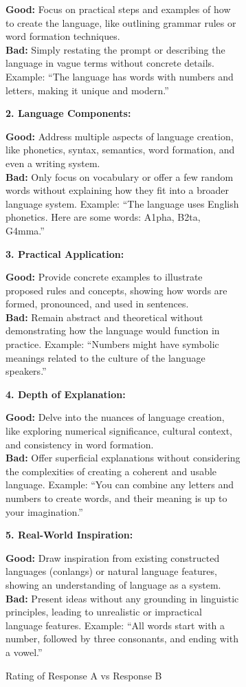 \begin{figure}[h]
\begin{subfigure}{\linewidth}
\begin{tcolorbox}[colback=blue!5!white,colframe=mybrown!75!black]
\begin{scriptsize}
\textbf{Good:} Focus on practical steps and examples of how to create the language, like outlining grammar rules or word formation techniques.\\
\textbf{Bad:} Simply restating the prompt or describing the language in vague terms without concrete details. Example: ``The language has words with numbers and letters, making it unique and modern.''

\textbf{2. Language Components:}

\textbf{Good:} Address multiple aspects of language creation, like phonetics, syntax, semantics, word formation, and even a writing system.\\
\textbf{Bad:} Only focus on vocabulary or offer a few random words without explaining how they fit into a broader language system. Example: ``The language uses English phonetics. Here are some words: A1pha, B2ta, G4mma.''

\textbf{3. Practical Application:}

\textbf{Good:} Provide concrete examples to illustrate proposed rules and concepts, showing how words are formed, pronounced, and used in sentences.\\
\textbf{Bad:} Remain abstract and theoretical without demonstrating how the language would function in practice. Example: ``Numbers might have symbolic meanings related to the culture of the language speakers.''

\textbf{4. Depth of Explanation:}

\textbf{Good:} Delve into the nuances of language creation, like exploring numerical significance, cultural context, and consistency in word formation.\\
\textbf{Bad:} Offer superficial explanations without considering the complexities of creating a coherent and usable language. Example: ``You can combine any letters and numbers to create words, and their meaning is up to your imagination.''

\textbf{5. Real-World Inspiration:}

\textbf{Good:} Draw inspiration from existing constructed languages (conlangs) or natural language features, showing an understanding of language as a system.\\
\textbf{Bad:} Present ideas without any grounding in linguistic principles, leading to unrealistic or impractical language features. Example: ``All words start with a number, followed by three consonants, and ending with a vowel.''

{\small Rating of Response A vs Response B}


\end{scriptsize}
\end{tcolorbox}
\end{subfigure}
\end{figure}
